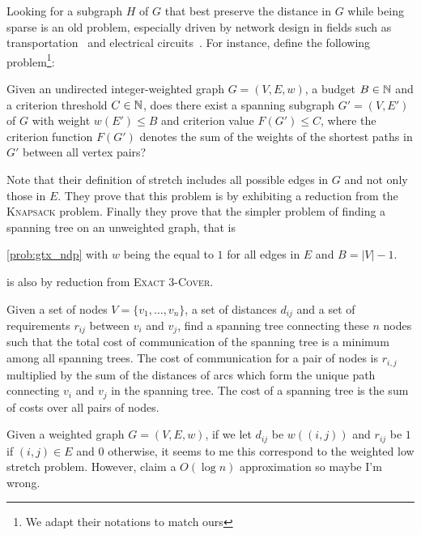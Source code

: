 Looking for a subgraph $H$ of $G$ that best preserve the distance in $G$ while being sparse is an old
problem, especially driven by network design in fields such as transportation~\autocite{RoadNetworks60}
and electrical circuits~\autocite{electricalNetworks60}. For instance, \textcite{Johnson1978} define
the following problem\footnote{We adapt their notations to match ours}:  
\begin{problem}
  \label{prob:gtx_ndp}
  Given an undirected integer-weighted graph $G=(V, E, w)$, a budget $B\in\mathbb{N}$ and a criterion
  threshold $C\in \mathbb{N}$, does there exist a spanning subgraph $G'=(V, E')$ of $G$ with weight
  $w(E') \leq B$ and criterion value $F(G') \leq C$, where the criterion function $F(G')$ denotes
  the sum of the weights of the shortest paths in $G'$ between all vertex pairs?
\end{problem}
Note that their definition of stretch includes all possible edges in $G$ and not only those in $E$.
They prove that this problem is \NPc{} by exhibiting a reduction from the \textsc{Knapsack}
problem. Finally they prove that the simpler problem of finding a spanning tree on an unweighted
graph, that is
\vspace{-.5\baselineskip}
\begin{problem}
  \autoref{prob:gtx_ndp} with $w$ being the equal to $1$ for all edges in $E$ and $B=|V|-1$.
\end{problem}%
\vspace{-.5\baselineskip}
\noindent is also \NPc{} by reduction from \textsc{Exact 3-Cover}.

\begin{problem}
Given a set of nodes $V=\{v_1, \ldots, v_n\}$, a set of distances $d_{ij}$ and a set of requirements
$r_{ij}$ between $v_i$ and $v_j$, find a spanning tree connecting these $n$ nodes such that the
total cost of communication of the spanning tree is a minimum among all spanning trees. The cost of
communication for a pair of nodes is $r_{i,j}$ multiplied by the sum of the distances of arcs which
form the unique path connecting $v_i$ and $v_j$ in the spanning tree. The cost of a spanning tree is
the sum of costs over all pairs of nodes.
\end{problem}

Given a weighted graph $G=(V,E,w)$, if we let $d_{ij}$ be $w((i,j))$ and $r_{ij}$ be $1$ if
$(i,j)\in E$ and $0$ otherwise, it seems to me this correspond to the weighted low stretch problem.
However, \textcite[Section 4]{lognMetricBoundConf03} claim a $O(\log n)$ approximation so maybe I'm
wrong.

